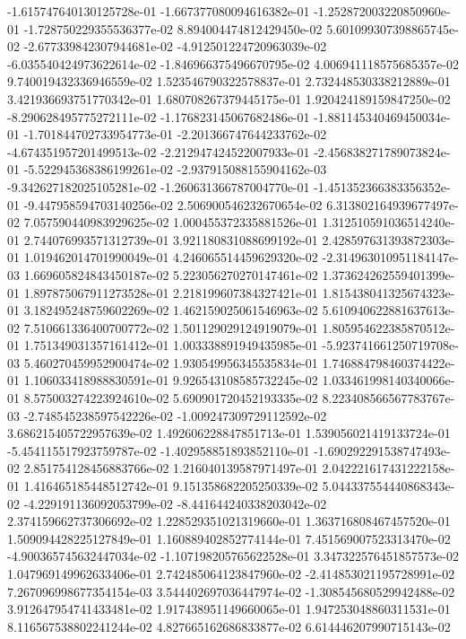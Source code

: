-1.615747640130125728e-01
-1.667377080094616382e-01
-1.252872003220850960e-01
-1.728750229355536377e-02
8.894004474812429450e-02
5.601099307398865745e-02
-2.677339842307944681e-02
-4.912501224720963039e-02
-6.035540424973622614e-02
-1.846966375496670795e-02
4.006941118575685357e-02
9.740019432336946559e-02
1.523546790322578837e-01
2.732448530338212889e-01
3.421936693751770342e-01
1.680708267379445175e-01
1.920424189159847250e-02
-8.290628495775272111e-02
-1.176823145067682486e-01
-1.881145340469450034e-01
-1.701844702733954773e-01
-2.201366747644233762e-02
-4.674351957201499513e-02
-2.212947424522007933e-01
-2.456838271789073824e-01
-5.522945368386199261e-02
-2.937915088155904162e-03
-9.342627182025105281e-02
-1.260631366787004770e-01
-1.451352366383356352e-01
-9.447958594703140256e-02
2.506900546232670654e-02
6.313802164939677497e-02
7.057590440983929625e-02
1.000455372335881526e-01
1.312510591036514240e-01
2.744076993571312739e-01
3.921180831088699192e-01
2.428597631393872303e-01
1.019462014701990049e-01
4.246065514459629320e-02
-2.314963010951184147e-03
1.669605824843450187e-02
5.223056270270147461e-02
1.373624262559401399e-01
1.897875067911273528e-01
2.218199607384327421e-01
1.815438041325674323e-01
3.182495248759602269e-02
1.462159025061546963e-02
5.610940622881637613e-02
7.510661336400700772e-02
1.501129029124919079e-01
1.805954622385870512e-01
1.751349031357161412e-01
1.003338891949435985e-01
-5.923741661250719708e-03
5.460270459952900474e-02
1.930549956345535834e-01
1.746884798460374422e-01
1.106033418988830591e-01
9.926543108585732245e-02
1.033461998140340066e-01
8.575003274223924610e-02
5.690901720452193335e-02
8.223408566567783767e-03
-2.748545238597542226e-02
-1.009247309729112592e-02
3.686215405722957639e-02
1.492606228847851713e-01
1.539056021419133724e-01
-5.454115517923759787e-02
-1.402958851893852110e-01
-1.690292291538747493e-02
2.851754128456883766e-02
1.216040139587971497e-01
2.042221617431222158e-01
1.416465185448512742e-01
9.151358682205250339e-02
5.044337554440868343e-02
-4.229191136092053799e-02
-8.441644240338203042e-02
2.374159662737306692e-02
1.228529351021319660e-01
1.363716808467457520e-01
1.509094428225127849e-01
1.160889402852774144e-01
7.451569007523313470e-02
-4.900365745632447034e-02
-1.107198205765622528e-01
3.347322576451857573e-02
1.047969149962633406e-01
2.742485064123847960e-02
-2.414853021195728991e-02
7.267096998677354154e-03
3.544402697036447974e-02
-1.308545680529942488e-02
3.912647954741433481e-02
1.917438951149660065e-01
1.947253048860311531e-01
8.116567538802241244e-02
4.827665162686833877e-02
6.614446207990715143e-02
